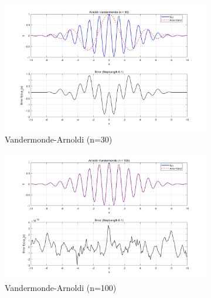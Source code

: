 \documentclass[11pt]{article}
\begin{document}
\FloatBarrier
\begin{figure}[H]
  \centering
  \begin{subfigure}[t]{0.484\textwidth}
    \centering
    \includegraphics[width=\textwidth]{VA30.png}
    \caption{Vandermonde-Arnoldi (n=30)}
    \label{fig:nev_whole1}
  \end{subfigure}
  \hfill
  \begin{subfigure}[t]{0.48\textwidth}
    \centering
    \includegraphics[width=\textwidth]{VA100.png}
    \caption{Vandermonde-Arnoldi (n=100)}
    \label{fig:nev_small1}
  \end{subfigure}
  \caption{Vandermonde-Arnoldi with different orders}
  \label{fig:nev_compare1}
  \begin{subfigure}[t]{0.58\textwidth}
    \centering

\end{subfigure}
\end{figure}
\end{document}
